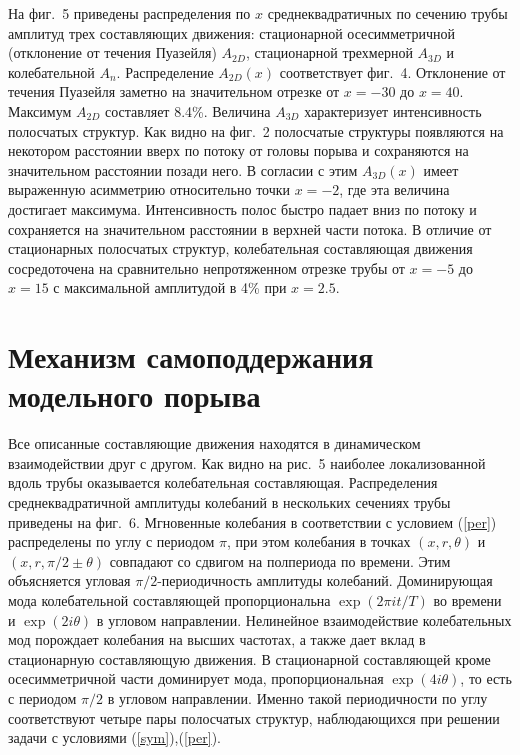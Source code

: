 На фиг.~5 приведены распределения по $x$ среднеквадратичных по сечению трубы амплитуд трех составляющих движения: стационарной осесимметричной (отклонение от течения Пуазейля) $A_{2D}$, стационарной трехмерной $A_{3D}$ и колебательной $A_n$. Распределение $A_{2D}(x)$ соответствует фиг.~4. Отклонение от течения Пуазейля заметно на значительном отрезке от $x=-30$ до $x=40$. Максимум $A_{2D}$ составляет  8.4\%. Величина $A_{3D}$ характеризует интенсивность полосчатых структур. Как видно на фиг.~2 полосчатые структуры появляются на некотором расстоянии вверх по потоку от головы порыва и сохраняются на значительном расстоянии позади него. В согласии с этим $A_{3D}(x)$ имеет выраженную асимметрию относительно точки $x=-2$, где эта величина достигает максимума. Интенсивность полос быстро падает вниз по потоку и сохраняется на значительном расстоянии в верхней части потока. В отличие от стационарных полосчатых структур, колебательная составляющая движения сосредоточена на сравнительно непротяженном отрезке трубы от $x=-5$ до $x=15$ с максимальной амплитудой в 4\% при $x=2.5$.

\section{Механизм самоподдержания модельного порыва} 

Все описанные составляющие движения находятся в динамическом взаимодействии друг с другом. Как видно на рис.~5 наиболее локализованной вдоль трубы оказывается колебательная составляющая. Распределения среднеквадратичной амплитуды колебаний в нескольких сечениях трубы приведены на фиг.~6. Мгновенные колебания в соответствии с условием (\ref{per}) распределены по углу с периодом $\pi$, при этом колебания в точках $(x,r,\theta)$ и $(x,r,\pi/2\pm\theta)$ совпадают со сдвигом на полпериода по времени. Этим объясняется угловая $\pi/2$-периодичность амплитуды колебаний. Доминирующая мода колебательной составляющей пропорциональна $\exp(2\pi it/T)$ во времени и $\exp(2i\theta)$ в угловом направлении. Нелинейное взаимодействие колебательных мод порождает колебания на высших частотах, а также дает вклад в стационарную составляющую движения. В стационарной составляющей кроме осесимметричной части доминирует мода, пропорциональная $\exp(4i\theta)$, то есть с периодом $\pi/2$ в угловом направлении. Именно такой периодичности по углу соответствуют четыре пары полосчатых структур, наблюдающихся при решении задачи с условиями (\ref{sym}),(\ref{per}).

